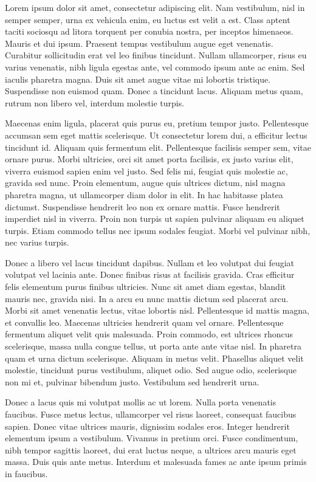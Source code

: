

Lorem ipsum dolor sit amet, consectetur adipiscing elit. Nam vestibulum, nisl in semper semper, urna ex vehicula enim, eu luctus est velit a est. Class aptent taciti sociosqu ad litora torquent per conubia nostra, per inceptos himenaeos. Mauris et dui ipsum. Praesent tempus vestibulum augue eget venenatis. Curabitur sollicitudin erat vel leo finibus tincidunt. Nullam ullamcorper, risus eu varius venenatis, nibh ligula egestas ante, vel commodo ipsum ante ac enim. Sed iaculis pharetra magna. Duis sit amet augue vitae mi lobortis tristique. Suspendisse non euismod quam. Donec a tincidunt lacus. Aliquam metus quam, rutrum non libero vel, interdum molestie turpis.

Maecenas enim ligula, placerat quis purus eu, pretium tempor justo. Pellentesque accumsan sem eget mattis scelerisque. Ut consectetur lorem dui, a efficitur lectus tincidunt id. Aliquam quis fermentum elit. Pellentesque facilisis semper sem, vitae ornare purus. Morbi ultricies, orci sit amet porta facilisis, ex justo varius elit, viverra euismod sapien enim vel justo. Sed felis mi, feugiat quis molestie ac, gravida sed nunc. Proin elementum, augue quis ultrices dictum, nisl magna pharetra magna, ut ullamcorper diam dolor in elit. In hac habitasse platea dictumst. Suspendisse hendrerit leo non ex ornare mattis. Fusce hendrerit imperdiet nisl in viverra. Proin non turpis ut sapien pulvinar aliquam eu aliquet turpis. Etiam commodo tellus nec ipsum sodales feugiat. Morbi vel pulvinar nibh, nec varius turpis.

Donec a libero vel lacus tincidunt dapibus. Nullam et leo volutpat dui feugiat volutpat vel lacinia ante. Donec finibus risus at facilisis gravida. Cras efficitur felis elementum purus finibus ultricies. Nunc sit amet diam egestas, blandit mauris nec, gravida nisi. In a arcu eu nunc mattis dictum sed placerat arcu. Morbi sit amet venenatis lectus, vitae lobortis nisl. Pellentesque id mattis magna, et convallis leo. Maecenas ultricies hendrerit quam vel ornare. Pellentesque fermentum aliquet velit quis malesuada. Proin commodo, est ultrices rhoncus scelerisque, massa nulla congue tellus, ut porta ante ante vitae nisl. In pharetra quam et urna dictum scelerisque. Aliquam in metus velit. Phasellus aliquet velit molestie, tincidunt purus vestibulum, aliquet odio. Sed augue odio, scelerisque non mi et, pulvinar bibendum justo. Vestibulum sed hendrerit urna.

Donec a lacus quis mi volutpat mollis ac ut lorem. Nulla porta venenatis faucibus. Fusce metus lectus, ullamcorper vel risus laoreet, consequat faucibus sapien. Donec vitae ultrices mauris, dignissim sodales eros. Integer hendrerit elementum ipsum a vestibulum. Vivamus in pretium orci. Fusce condimentum, nibh tempor sagittis laoreet, dui erat luctus neque, a ultrices arcu mauris eget massa. Duis quis ante metus. Interdum et malesuada fames ac ante ipsum primis in faucibus.

